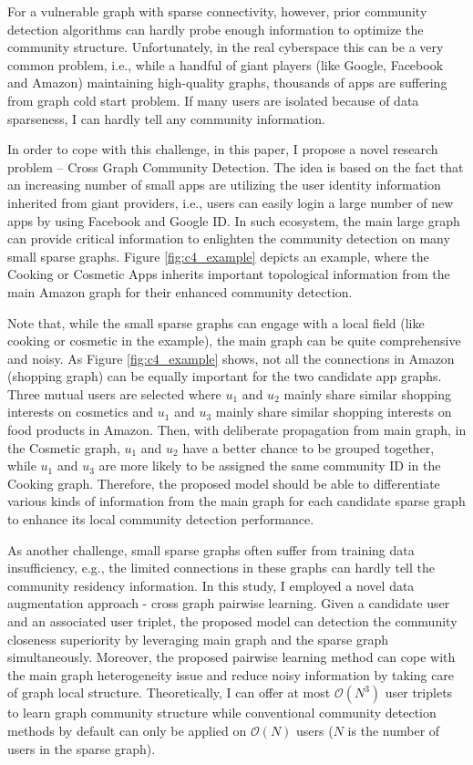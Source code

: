 For a vulnerable graph with sparse connectivity, however, prior community detection algorithms can hardly probe enough information to optimize the community structure. Unfortunately, in the real cyberspace this can be a very common problem, i.e., while a handful of giant players (like Google, Facebook and Amazon) maintaining high-quality graphs, thousands of apps are suffering from graph cold start problem. If many users are isolated because of data sparseness, I can hardly tell any community information. 

In order to cope with this challenge, in this paper, I propose a novel research problem – Cross Graph Community Detection. The idea is based on the fact that an increasing number of small apps are utilizing the user identity information inherited from giant providers, i.e., users can easily login a large number of new apps by using Facebook and Google ID. In such ecosystem, the main large graph can provide critical information to enlighten the community detection on many small sparse graphs. Figure \ref{fig:c4_example} depicts an example, where the Cooking or Cosmetic Apps inherits important topological information from the main Amazon graph for their enhanced community detection. 

Note that, while the small sparse graphs can engage with a local field (like cooking or cosmetic in the example), the main graph can be quite comprehensive and noisy. As Figure \ref{fig:c4_example} shows, not all the connections in Amazon (shopping graph) can be equally important for the two candidate app graphs. Three mutual users are selected where $u_1$ and $u_2$ mainly share similar shopping interests on cosmetics and $u_1$ and $u_3$ mainly share similar shopping interests on food products in Amazon. Then, with deliberate propagation from main graph, in the Cosmetic graph, $u_1$ and $u_2$ have a better chance to be grouped together, while $u_1$ and $u_3$ are more likely to be assigned the same community ID in the Cooking graph. Therefore, the proposed model should be able to differentiate various kinds of information from the main graph for each candidate sparse graph to enhance its local community detection performance. 

As another challenge, small sparse graphs often suffer from training data insufficiency, e.g., the limited connections in these graphs can hardly tell the community residency information. In this study, I employed a novel data augmentation approach - cross graph pairwise learning. Given a candidate user and an associated user triplet, the proposed model can detection the community closeness superiority by leveraging main graph and the sparse graph simultaneously. Moreover, the proposed pairwise learning method can cope with the main graph heterogeneity issue and reduce noisy information by taking care of graph local structure. Theoretically, I can offer at most $\mathcal{O}(N^{3})$ user triplets to learn graph community structure while conventional community detection methods by default can only be applied on $\mathcal{O}(N)$ users  ($N$ is the number of users in the sparse graph).

